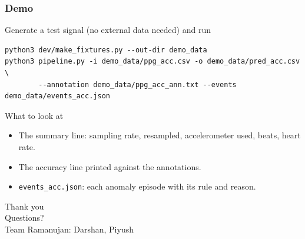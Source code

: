 \documentclass[t,aspectratio=169]{beamer}
\newcommand{\code}[1]{\texttt{#1}}
\begin{document}
\begin{frame}[fragile]
\frametitle{Demo}
\begin{block}{Generate a test signal (no external data needed) and run}
\scriptsize
\begin{verbatim}
python3 dev/make_fixtures.py --out-dir demo_data
python3 pipeline.py -i demo_data/ppg_acc.csv -o demo_data/pred_acc.csv \
        --annotation demo_data/ppg_acc_ann.txt --events demo_data/events_acc.json
\end{verbatim}
\end{block}
\begin{exampleblock}{What to look at}
\small
\begin{itemize}
  \item The summary line: sampling rate, resampled, accelerometer used, beats, heart rate.
  \item The accuracy line printed against the annotations.
  \item \code{events\_acc.json}: each anomaly episode with its rule and reason.
\end{itemize}
\end{exampleblock}
\end{frame}

\begin{frame}[plain]
\vfill
\centering
{\Huge Thank you}\\[3ex]
{\Large Questions?}\\[4ex]
\small Team Ramanujan: Darshan, Piyush
\vfill
\end{frame}
\end{document}
